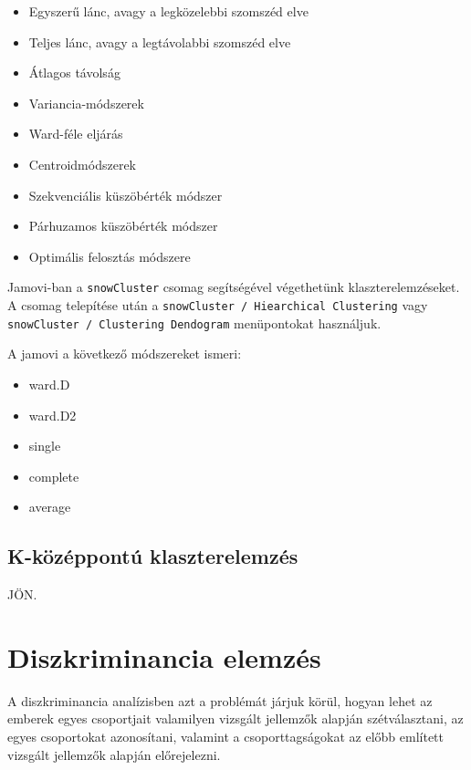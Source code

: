 \documentclass[
  letterpaper,
]{krantz}
\providecommand{\tightlist}{%
  \setlength{\itemsep}{0pt}\setlength{\parskip}{0pt}}\usepackage{longtable,booktabs,array}
\begin{document}
\begin{itemize}
\tightlist
\item
  Egyszerű lánc, avagy a legközelebbi szomszéd elve
\item
  Teljes lánc, avagy a legtávolabbi szomszéd elve
\item
  Átlagos távolság
\item
  Variancia-módszerek
\item
  Ward-féle eljárás
\item
  Centroidmódszerek
\item
  Szekvenciális küszöbérték módszer
\item
  Párhuzamos küszöbérték módszer
\item
  Optimális felosztás módszere
\end{itemize}

Jamovi-ban a \texttt{snowCluster} csomag segítségével végethetünk
klaszterelemzéseket. A csomag telepítése után a
\texttt{snowCluster\ /\ Hiearchical\ Clustering} vagy
\texttt{snowCluster\ /\ Clustering\ Dendogram} menüpontokat használjuk.

A jamovi a következő módszereket ismeri:

\begin{itemize}
\tightlist
\item
  ward.D
\item
  ward.D2
\item
  single
\item
  complete
\item
  average
\end{itemize}

\hypertarget{k-kuxf6zuxe9ppontuxfa-klaszterelemzuxe9s}{%
\section{K-középpontú
klaszterelemzés}\label{k-kuxf6zuxe9ppontuxfa-klaszterelemzuxe9s}}

JÖN.


\hypertarget{sec-diszkriminancia-elemzes}{%
\chapter{Diszkriminancia elemzés}\label{sec-diszkriminancia-elemzes}}

A diszkriminancia analízisben azt a problémát járjuk körül, hogyan lehet
az emberek egyes csoportjait valamilyen vizsgált jellemzők alapján
szétválasztani, az egyes csoportokat azonosítani, valamint a
csoporttagságokat az előbb említett vizsgált jellemzők alapján
előrejelezni.
\end{document}
